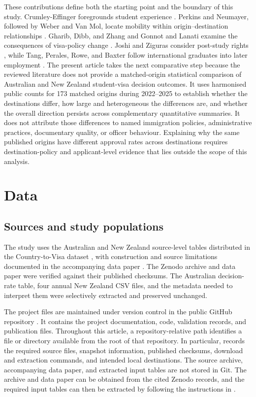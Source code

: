 \documentclass[runningheads]{llncs}
\begin{document}
These contributions define both the starting point and the boundary of this study. Crumley-Effinger foregrounds student experience \cite{CrumleyEffinger2024}. Perkins and Neumayer, followed by Weber and Van Mol, locate mobility within origin--destination relationships \cite{PerkinsNeumayer2014,Weber2023}. Gharib, Dibb, and Zhang and Gonnot and Lanati examine the consequences of visa-policy change \cite{GharibEtAl2026,Gonnot2025}. Joshi and Ziguras consider post-study rights \cite{JoshiZiguras2024}, while Tang, Perales, Rowe, and Baxter follow international graduates into later employment \cite{TangEtAl2022}. The present article takes the next comparative step because the reviewed literature does not provide a matched-origin statistical comparison of Australian and New Zealand student-visa decision outcomes. It uses harmonised public counts for 173 matched origins during 2022--2025 to establish whether the destinations differ, how large and heterogeneous the differences are, and whether the overall direction persists across complementary quantitative summaries. It does not attribute those differences to named immigration policies, administrative practices, documentary quality, or officer behaviour. Explaining why the same published origins have different approval rates across destinations requires destination-policy and applicant-level evidence that lies outside the scope of this analysis.

\section{Data}

\subsection{Sources and study populations}

The study uses the Australian and New Zealand source-level tables distributed in the Country-to-Visa dataset \cite{Kaplan2026CountryToVisaDataset}, with construction and source limitations documented in the accompanying data paper \cite{Kaplan2026CrossNationalDataPaper}. The Zenodo archive and data paper were verified against their published checksums. The Australian decision-rate table, four annual New Zealand CSV files, and the metadata needed to interpret them were selectively extracted and preserved unchanged.

The project files are maintained under version control in the public GitHub repository \cite{Kaplan2026AUNZComparisonRepository}. It contains the project documentation, code, validation records, and publication files. Throughout this article, a repository-relative path identifies a file or directory available from the root of that repository. In particular,  records the required source files, snapshot information, published checksums, download and extraction commands, and intended local destinations. The source archive, accompanying data paper, and extracted input tables are not stored in Git. The archive and data paper can be obtained from the cited Zenodo records, and the required input tables can then be extracted by following the instructions in .
\end{document}

